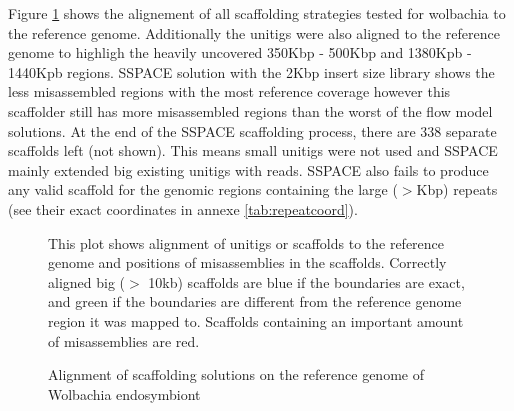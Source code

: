 \documentclass[12pt]{article}
\begin{document}
Figure \ref{fig:alignwoinsert} shows the alignement of all scaffolding strategies tested for wolbachia to the reference genome. Additionally the unitigs were also aligned to the reference genome to highligh the heavily uncovered 350Kbp - 500Kbp and 1380Kpb - 1440Kpb regions. SSPACE solution with the 2Kbp insert size library shows the less misassembled regions with the most reference coverage however this scaffolder still has more misassembled regions than the worst of the flow model solutions. At the end of the SSPACE scaffolding process, there are 338 separate scaffolds left (not shown). This means small unitigs were not used and SSPACE mainly extended big existing unitigs with reads. SSPACE also fails to produce any valid scaffold for the genomic regions containing the large ($>$Kbp) repeats (see their exact coordinates in annexe \ref{tab:repeatcoord}).
\begin{figure}[h!]
\begin{center}
\end{center}
\caption{Alignment of scaffolding solutions on the reference genome of Wolbachia endosymbiont}
\scriptsize This plot shows alignment of unitigs or scaffolds to the reference genome and positions of misassemblies in the scaffolds. Correctly aligned big ($>$ 10kb) scaffolds are blue if the boundaries are exact, and green if the boundaries are different from the reference genome region it was mapped to. Scaffolds containing an important amount of misassemblies are red.
\label{fig:alignwoinsert}
\end{figure}
\end{document}
